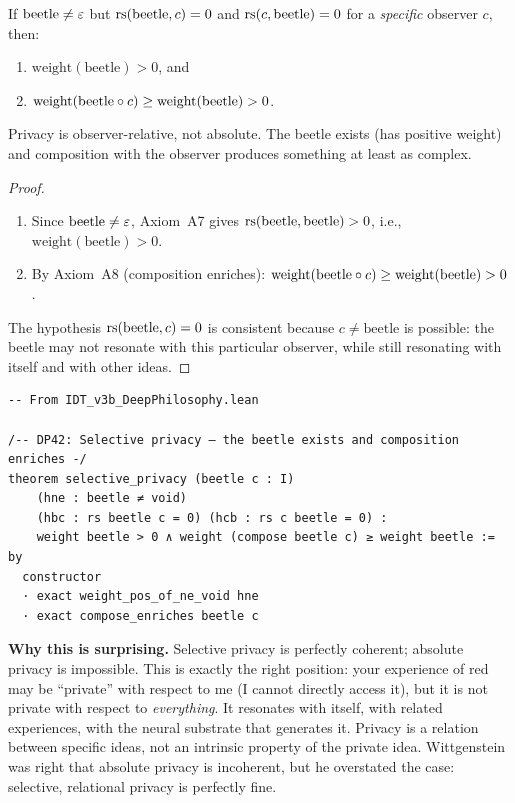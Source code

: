 \begin{theorem}
\label{thm:selective-privacy}
If $\mathrm{beetle} \neq \varepsilon$ but $\mathrm{rs}(\mathrm{beetle}, c) = 0$ and
$\mathrm{rs}(c, \mathrm{beetle}) = 0$ for a \emph{specific} observer $c$, then:
\begin{enumerate}
\item $\mathrm{weight}(\mathrm{beetle}) > 0$, and
\item $\mathrm{weight}(\mathrm{beetle} \circ c) \geq
      \mathrm{weight}(\mathrm{beetle}) > 0$.
\end{enumerate}
Privacy is observer-relative, not absolute.  The beetle exists (has positive
weight) and composition with the observer produces something at least as
complex.
\end{theorem}

\begin{proof}
\begin{enumerate}
\item Since $\mathrm{beetle} \neq \varepsilon$, Axiom~A7 gives
  $\mathrm{rs}(\mathrm{beetle}, \mathrm{beetle}) > 0$, i.e.,
  $\mathrm{weight}(\mathrm{beetle}) > 0$.
\item By Axiom~A8 (composition enriches):
  $\mathrm{weight}(\mathrm{beetle} \circ c) \geq
   \mathrm{weight}(\mathrm{beetle}) > 0$.
\end{enumerate}
The hypothesis $\mathrm{rs}(\mathrm{beetle}, c) = 0$ is consistent because $c \neq
\mathrm{beetle}$ is possible: the beetle may not resonate with this particular
observer, while still resonating with itself and with other ideas.
\end{proof}

\begin{lstlisting}
-- From IDT_v3b_DeepPhilosophy.lean

/-- DP42: Selective privacy — the beetle exists and composition enriches -/
theorem selective_privacy (beetle c : I)
    (hne : beetle ≠ void)
    (hbc : rs beetle c = 0) (hcb : rs c beetle = 0) :
    weight beetle > 0 ∧ weight (compose beetle c) ≥ weight beetle := by
  constructor
  · exact weight_pos_of_ne_void hne
  · exact compose_enriches beetle c
\end{lstlisting}

\begin{surprisebox}
\noindent\textbf{Why this is surprising.}
Selective privacy is perfectly coherent; absolute privacy is impossible.  This
is exactly the right position: your experience of red may be ``private'' with
respect to me (I cannot directly access it), but it is not private with respect
to \emph{everything}.  It resonates with itself, with related experiences, with
the neural substrate that generates it.  Privacy is a relation between specific
ideas, not an intrinsic property of the private idea.  Wittgenstein was right
that absolute privacy is incoherent, but he overstated the case: selective,
relational privacy is perfectly fine.
\end{surprisebox}


